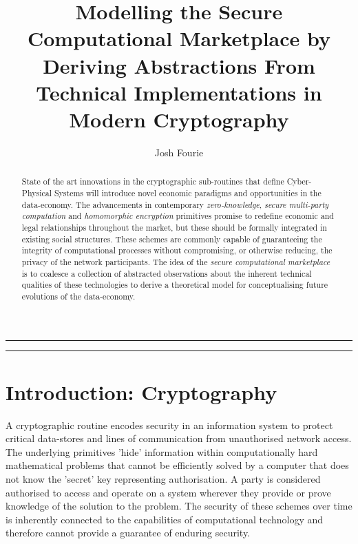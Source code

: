 \documentclass[twocolumn]{scrartcl}
\title{Modelling the Secure Computational Marketplace by Deriving Abstractions From Technical Implementations in Modern Cryptography}
\author{Josh Fourie}
\date{}
\begin{document}
\maketitle


\noindent \rule{7.08cm}{1pt}
\begin{abstract}
	State of the art innovations in the cryptographic sub-routines that define Cyber-Physical Systems will introduce novel economic paradigms and opportunities in the data-economy. The advancements in contemporary \textit{zero-knowledge}, \textit{secure multi-party computation} and \textit{homomorphic encryption} primitives promise to redefine economic and legal relationships throughout the market, but these should be formally integrated in existing social structures. These schemes are commonly capable of guaranteeing the integrity of computational processes without compromising, or otherwise reducing, the privacy of the network participants. The idea of the \textit{secure computational marketplace} is to coalesce a collection of abstracted observations about the inherent technical qualities of these technologies to derive a theoretical model for conceptualising future evolutions of the data-economy.
	
\end{abstract}
\noindent \rule{7.08cm}{0.5pt}

\section{Introduction: Cryptography}
A cryptographic routine encodes security in an information system to protect critical data-stores and lines of communication from unauthorised network access. The underlying primitives 'hide'  information within computationally hard mathematical problems that cannot be efficiently solved by a computer that does not know the 'secret' key representing authorisation. A party is considered authorised to access and operate on a system wherever they provide or prove knowledge of the solution to the problem. The security of these schemes over time is inherently connected to the capabilities of computational technology and therefore cannot provide a guarantee of enduring security.
\end{document}
